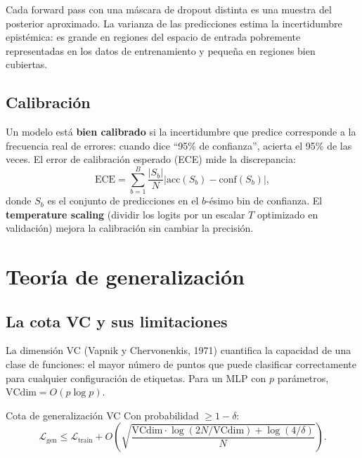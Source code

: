 Cada forward pass con una máscara de dropout distinta es una muestra del
posterior aproximado. La varianza de las predicciones estima la
incertidumbre epistémica: es grande en regiones del espacio de entrada
pobremente representadas en los datos de entrenamiento y pequeña en
regiones bien cubiertas.

\subsection{Calibración}
\label{subsec:calibracion}

Un modelo está \textbf{bien calibrado} si la incertidumbre que predice
corresponde a la frecuencia real de errores: cuando dice ``95\% de
confianza'', acierta el 95\% de las veces. El error de calibración
esperado (ECE) mide la discrepancia:
\begin{equation}
  \text{ECE} = \sum_{b=1}^B \frac{|S_b|}{N}
  |\text{acc}(S_b) - \text{conf}(S_b)|,
  \label{eq:ece}
\end{equation}
donde $S_b$ es el conjunto de predicciones en el $b$-ésimo bin de
confianza. El \textbf{temperature scaling} (dividir los logits por un
escalar $T$ optimizado en validación) mejora la calibración sin cambiar
la precisión.

\section{Teoría de generalización}
\label{sec:generalizacion_teoria}


\subsection{La cota VC y sus limitaciones}
\label{subsec:vc}

La dimensión VC (Vapnik y Chervonenkis, 1971) cuantifica la capacidad de
una clase de funciones: el mayor número de puntos que puede clasificar
correctamente para cualquier configuración de etiquetas. Para un MLP con
$p$ parámetros, $\text{VCdim} = O(p\log p)$.

\begin{proposicion}{Cota de generalización VC}
\label{prop:vc}
Con probabilidad $\geq 1-\delta$:
\begin{equation}
  \mathcal{L}_{\text{gen}} \leq \mathcal{L}_{\text{train}}
  + O\!\left(\sqrt{\frac{\text{VCdim}\cdot\log(2N/\text{VCdim})
  + \log(4/\delta)}{N}}\right).
  \label{eq:vc}
\end{equation}
\end{proposicion}

